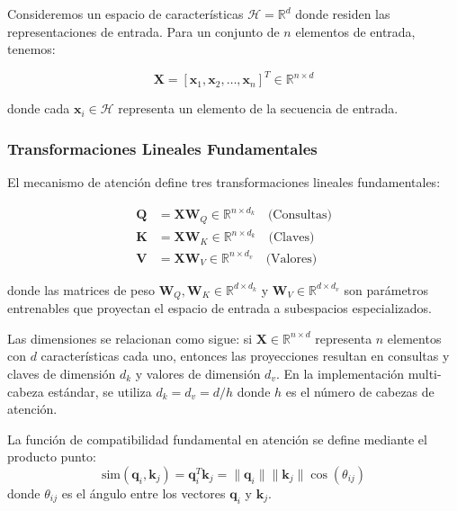 Consideremos un espacio de características $\mathcal{H} = \mathbb{R}^d$ donde residen las representaciones de entrada. Para un conjunto de $n$ elementos de entrada, tenemos:

\begin{equation}
    \mathbf{X} = [\mathbf{x}_1, \mathbf{x}_2, \ldots, \mathbf{x}_n]^T \in \mathbb{R}^{n \times d}
    \label{eq:input_matrix}
\end{equation}

donde cada $\mathbf{x}_i \in \mathcal{H}$ representa un elemento de la secuencia de entrada.

\subsubsection{Transformaciones Lineales Fundamentales}

El mecanismo de atención define tres transformaciones lineales fundamentales:

\begin{align}
    \mathbf{Q} &= \mathbf{X}\mathbf{W}_Q \in \mathbb{R}^{n \times d_k} \quad \text{(Consultas)} \\
    \mathbf{K} &= \mathbf{X}\mathbf{W}_K \in \mathbb{R}^{n \times d_k} \quad \text{(Claves)} \\
    \mathbf{V} &= \mathbf{X}\mathbf{W}_V \in \mathbb{R}^{n \times d_v} \quad \text{(Valores)}
    \label{eq:linear_projections}
\end{align}

donde las matrices de peso $\mathbf{W}_Q, \mathbf{W}_K \in \mathbb{R}^{d \times d_k}$ y $\mathbf{W}_V \in \mathbb{R}^{d \times d_v}$ son parámetros entrenables que proyectan el espacio de entrada a subespacios especializados. 

Las dimensiones se relacionan como sigue: si $\mathbf{X} \in \mathbb{R}^{n \times d}$ representa $n$ elementos con $d$ características cada uno, entonces las proyecciones resultan en consultas y claves de dimensión $d_k$ y valores de dimensión $d_v$. En la implementación multi-cabeza estándar, se utiliza $d_k = d_v = d/h$ donde $h$ es el número de cabezas de atención.

\begin{definition}\label{def:dot_product_similarity}
    La función de compatibilidad fundamental en atención se define mediante el producto punto:
    \begin{equation}
        \text{sim}(\mathbf{q}_i, \mathbf{k}_j) = \mathbf{q}_i^T \mathbf{k}_j = \|\mathbf{q}_i\| \|\mathbf{k}_j\| \cos(\theta_{ij})
        \label{eq:dot_product_similarity}
    \end{equation}
    donde $\theta_{ij}$ es el ángulo entre los vectores $\mathbf{q}_i$ y $\mathbf{k}_j$.
\end{definition}


